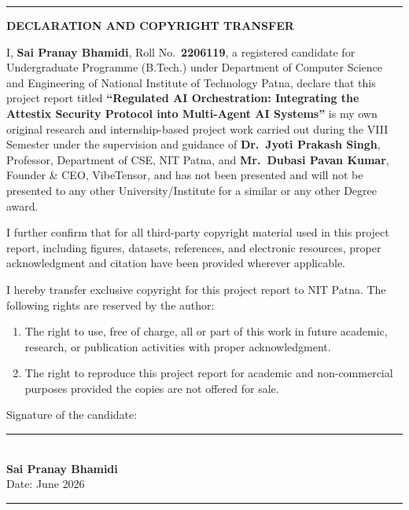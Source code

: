 \pagebreak
{}
\cleardoublepage
{}

\noindent\rule{\linewidth}{2pt}
\begin{center}
{\bf \Large DECLARATION AND COPYRIGHT TRANSFER}\\
\par\vspace{5mm}
\end{center}

\noindent
I, \textbf{Sai Pranay Bhamidi}, Roll No.\ \textbf{2206119}, a registered candidate for Undergraduate Programme (B.Tech.) under Department of Computer Science and Engineering of National Institute of Technology Patna, declare that this project report titled \textbf{``Regulated AI Orchestration: Integrating the Attestix Security Protocol into Multi-Agent AI Systems''} is my own original research and internship-based project work carried out during the VIII Semester under the supervision and guidance of \textbf{Dr.\ Jyoti Prakash Singh}, Professor, Department of CSE, NIT Patna, and \textbf{Mr.\ Dubasi Pavan Kumar}, Founder \& CEO, VibeTensor, and has not been presented and will not be presented to any other University/Institute for a similar or any other Degree award.

\vspace{0.8cm}

\noindent
I further confirm that for all third-party copyright material used in this project report, including figures, datasets, references, and electronic resources, proper acknowledgment and citation have been provided wherever applicable.

\vspace{0.8cm}

\noindent
I hereby transfer exclusive copyright for this project report to NIT Patna. The following rights are reserved by the author:

\vspace{0.3cm}

\begin{enumerate}
\item[(a)] The right to use, free of charge, all or part of this work in future academic, research, or publication activities with proper acknowledgment.

\vspace{0.2cm}

\item[(b)] The right to reproduce this project report for academic and non-commercial purposes provided the copies are not offered for sale.
\end{enumerate}

\vspace{1.5cm}

\noindent
Signature of the candidate:

\vspace{0.3cm}

\noindent
\rule{6cm}{0.15mm}\\[0.2cm]
\textbf{Sai Pranay Bhamidi}\\[0.2cm]
Date: June 2026

\vfill
\noindent\rule{\linewidth}{2pt}
